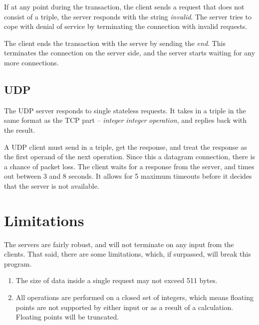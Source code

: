 \documentclass[12pt]{article}
\begin{document}
If at any point during the transaction, the client sends a request that does not consist of a triple, the server responds with the string \emph{invalid}. The server tries to cope with denial of service by terminating the connection with invalid requests.

The client ends the transaction with the server by sending the \emph{end}. This terminates the connection on the server side, and the server starts waiting for any more connections.


\subsection{UDP}
The UDP server responds to single stateless requests. It takes in a triple in the same format as the TCP part -- \emph{integer} \emph{integer} \emph{operation}, and replies back with the result.

A UDP client must send in a triple, get the response, and treat the response as the first operand of the next operation. Since this a datagram connection, there is a chance of packet loss. The client waits for a response from the server, and times out between 3 and 8 seconds. It allows for 5 maximum timeouts before it decides that the server is not available.

\section{Limitations}
The servers are fairly robust, and will not terminate on any input from the clients. That said, there are some limitations, which, if surpassed, will break this program.
\begin{enumerate}
\item The size of data inside a single request may not exceed 511 bytes.
\item All operations are performed on a closed set of integers, which means floating points are not supported by either input or as a result of a calculation. Floating points will be truncated.
\end{enumerate}
\end{document}

